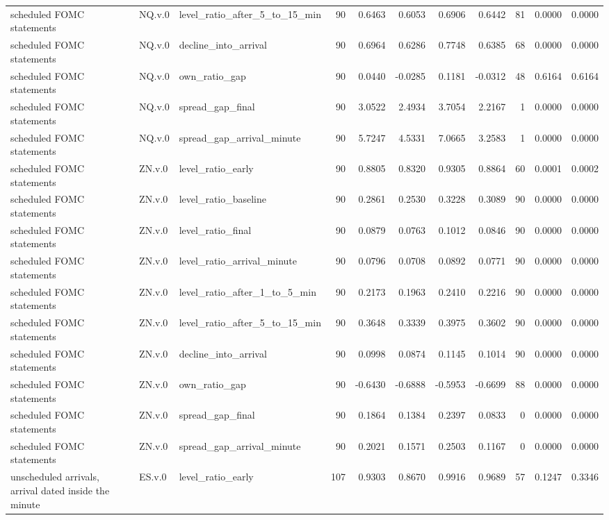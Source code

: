 \begin{tabular}{lllrrrrrrrr}
scheduled FOMC statements & NQ.v.0 & level_ratio_after_5_to_15_min & 90 & 0.6463 & 0.6053 & 0.6906 & 0.6442 & 81 & 0.0000 & 0.0000 \\
scheduled FOMC statements & NQ.v.0 & decline_into_arrival & 90 & 0.6964 & 0.6286 & 0.7748 & 0.6385 & 68 & 0.0000 & 0.0000 \\
scheduled FOMC statements & NQ.v.0 & own_ratio_gap & 90 & 0.0440 & -0.0285 & 0.1181 & -0.0312 & 48 & 0.6164 & 0.6164 \\
scheduled FOMC statements & NQ.v.0 & spread_gap_final & 90 & 3.0522 & 2.4934 & 3.7054 & 2.2167 & 1 & 0.0000 & 0.0000 \\
scheduled FOMC statements & NQ.v.0 & spread_gap_arrival_minute & 90 & 5.7247 & 4.5331 & 7.0665 & 3.2583 & 1 & 0.0000 & 0.0000 \\
scheduled FOMC statements & ZN.v.0 & level_ratio_early & 90 & 0.8805 & 0.8320 & 0.9305 & 0.8864 & 60 & 0.0001 & 0.0002 \\
scheduled FOMC statements & ZN.v.0 & level_ratio_baseline & 90 & 0.2861 & 0.2530 & 0.3228 & 0.3089 & 90 & 0.0000 & 0.0000 \\
scheduled FOMC statements & ZN.v.0 & level_ratio_final & 90 & 0.0879 & 0.0763 & 0.1012 & 0.0846 & 90 & 0.0000 & 0.0000 \\
scheduled FOMC statements & ZN.v.0 & level_ratio_arrival_minute & 90 & 0.0796 & 0.0708 & 0.0892 & 0.0771 & 90 & 0.0000 & 0.0000 \\
scheduled FOMC statements & ZN.v.0 & level_ratio_after_1_to_5_min & 90 & 0.2173 & 0.1963 & 0.2410 & 0.2216 & 90 & 0.0000 & 0.0000 \\
scheduled FOMC statements & ZN.v.0 & level_ratio_after_5_to_15_min & 90 & 0.3648 & 0.3339 & 0.3975 & 0.3602 & 90 & 0.0000 & 0.0000 \\
scheduled FOMC statements & ZN.v.0 & decline_into_arrival & 90 & 0.0998 & 0.0874 & 0.1145 & 0.1014 & 90 & 0.0000 & 0.0000 \\
scheduled FOMC statements & ZN.v.0 & own_ratio_gap & 90 & -0.6430 & -0.6888 & -0.5953 & -0.6699 & 88 & 0.0000 & 0.0000 \\
scheduled FOMC statements & ZN.v.0 & spread_gap_final & 90 & 0.1864 & 0.1384 & 0.2397 & 0.0833 & 0 & 0.0000 & 0.0000 \\
scheduled FOMC statements & ZN.v.0 & spread_gap_arrival_minute & 90 & 0.2021 & 0.1571 & 0.2503 & 0.1167 & 0 & 0.0000 & 0.0000 \\
unscheduled arrivals, arrival dated inside the minute & ES.v.0 & level_ratio_early & 107 & 0.9303 & 0.8670 & 0.9916 & 0.9689 & 57 & 0.1247 & 0.3346 \\

\end{tabular}
